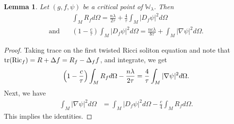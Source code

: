 \documentclass{amsart}
\newtheorem{lemma}[theorem]{Lemma}
\theoremstyle{definition}
\theoremstyle{remark}
\numberwithin{equation}{section}
\newcommand{\tr}{\textup{tr}}
\newcommand{\Ric}{\textup{Ric}}
\renewcommand{\div}{\,\textup{div}}
\begin{document}
%

\begin{lemma}\label{lem:critical_point}
	Let  $(g,f,\psi)$ be a critical point of $\mathbb W_\lambda$. Then
	\begin{align*}
		&\int_M R_f d\Omega = \frac{n\lambda}{2\tau} + \frac{4}{\tau}\int_M |D_f\psi|^2 d\Omega\\[1ex]
		\text{and}\quad &\left(1-\frac{c}{\tau}\right)\int_M |D_f\psi|^2 d\Omega = \frac{nc\lambda}{8\tau} + \int_M |\nabla\psi|^2 d\Omega.
	\end{align*}
	\[	\]
\end{lemma}

\begin{proof}
	Taking trace on the first twisted Ricci soliton equation and note that $\tr(\Ric_f) = R + \Delta f = R_f - \Delta_ff$, and integrate, we get
	\begin{align*}
		\Bigl(1-\frac{c}{\tau}\Bigr)\int_M R_f d\Omega -\frac{n\lambda}{2\tau} = \frac{4}{\tau}\int_M |\nabla\psi|^2 d\Omega.
	\end{align*}
	Next, we have
	\begin{align*}
		\int_M |\nabla\psi|^2 d\Omega &= \int_M |D_f\psi|^2 d\Omega - \frac{c}{4}\int_M R_f d\Omega.
	\end{align*}
	This implies the identities.
\end{proof}
\end{document}
